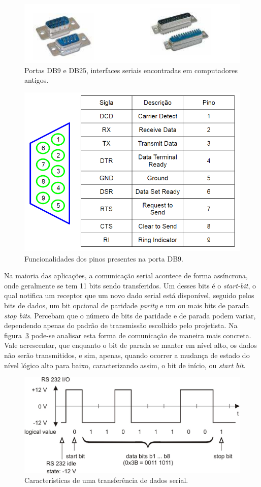 \documentclass[12pt]{article}
\begin{document}
\begin{figure}[h]
\centering
\includegraphics[width=.5\textwidth]{img/fig8DB9DB25.png}
\caption{Portas DB9 e DB25, interfaces seriais encontradas em computadores antigos.}
\label{fig:db9db25}
\end{figure}

\begin{figure}[h]
\centering
\includegraphics[width=.5\textwidth]{img/Fig9serial_pinos.png}
\caption{Funcionalidades dos pinos presentes na porta DB9.}
\label{fig:pinosdb9}
\end{figure}



Na maioria das aplicações, a comunicação serial acontece de forma assíncrona, onde geralmente se tem 11 bits sendo transferidos. Um desses bits é o \textit{start-bit}, o qual notifica um receptor que um novo dado serial está disponível, seguido pelos bits de dados, um bit opcional de paridade \textit{parity} e um ou mais bits de parada \textit{stop bits}\cite{porta-serial}. Percebam que o número de bits de paridade e de parada podem variar, dependendo apenas do padrão de transmissão escolhido pelo projetista. Na figura~\ref{fig:cserial} pode-se analisar esta forma de comunicação de maneira mais concreta. Vale acrescentar, que enquanto o bit de parada se manter em nível alto, os dados não serão transmitidos, e sim, apenas, quando ocorrer a mudança de estado do nível lógico alto para baixo, caracterizando assim, o bit de início, ou \textit{start bit}. 


\begin{figure}[h]
\centering
\includegraphics[width=.5\textwidth]{img/Fig10rs232.jpg}
\caption{Características de uma transferência de dados serial.}
\label{fig:cserial}
\end{figure}
\end{document}
